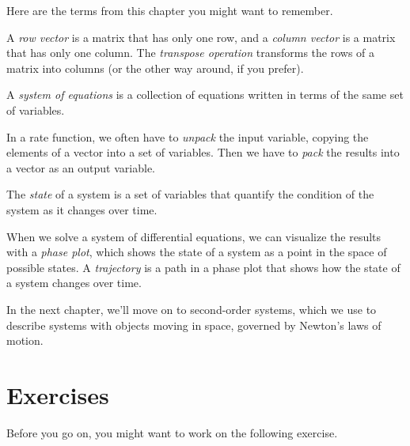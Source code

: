 Here are the terms from this chapter you might want to remember.

A \emph{row vector} is a matrix that has only one row, and a \emph{column vector} is a matrix that has only one column.
The \emph{transpose operation} transforms the  rows of a matrix
into columns (or the other way around, if you prefer).

A \emph{system of equations} is a collection of equations written in terms of
the same set of variables.

In a rate function, we often have to \emph{unpack} the input variable,
copying the elements of a vector into a set of variables.
Then we have to \emph{pack} the results into a vector as an output variable.

The \emph{state} of a system is a set of variables that quantify the condition of the system as it changes over time.

When we solve a system of differential equations, we can visualize the results with a \emph{phase plot}, which shows the state of a system as a point in the space of possible states.
A \emph{trajectory} is a path in a phase plot that shows how the state of a system changes over time.

In the next chapter, we'll move on to second-order systems, which we use to describe systems
with objects moving in space, governed by Newton's laws of motion.


\section{Exercises}

Before you go on, you might want to work on the following exercise.

